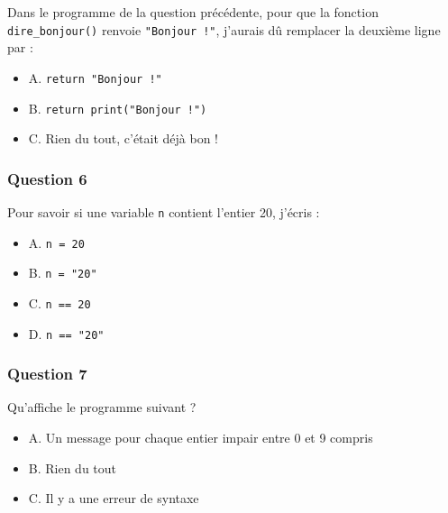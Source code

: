 \documentclass[
]{article}
\newenvironment{Shaded}{}{}
\newcommand{\BuiltInTok}[1]{#1}
\newcommand{\ControlFlowTok}[1]{\textcolor[rgb]{0.00,0.44,0.13}{\textbf{#1}}}
\newcommand{\DecValTok}[1]{\textcolor[rgb]{0.25,0.63,0.44}{#1}}
\newcommand{\KeywordTok}[1]{\textcolor[rgb]{0.00,0.44,0.13}{\textbf{#1}}}
\newcommand{\NormalTok}[1]{#1}
\newcommand{\OperatorTok}[1]{\textcolor[rgb]{0.40,0.40,0.40}{#1}}
\newcommand{\StringTok}[1]{\textcolor[rgb]{0.25,0.44,0.63}{#1}}
\providecommand{\tightlist}{%
  \setlength{\itemsep}{0pt}\setlength{\parskip}{0pt}}
\begin{document}
Dans le programme de la question précédente, pour que la fonction
\texttt{dire\_bonjour()} renvoie \texttt{"Bonjour\ !"}, j'aurais dû
remplacer la deuxième ligne par :

\begin{itemize}
\tightlist
\item
  A. \texttt{return\ "Bonjour\ !"}
\item
  B. \texttt{return\ print("Bonjour\ !")}
\item
  C. Rien du tout, c'était déjà bon !
\end{itemize}

\hypertarget{question-6}{%
\subsubsection{Question 6}\label{question-6}}

Pour savoir si une variable \texttt{n} contient l'entier 20, j'écris :

\begin{itemize}
\tightlist
\item
  A. \texttt{n\ =\ 20}
\item
  B. \texttt{n\ =\ "20"}
\item
  C. \texttt{n\ ==\ 20}
\item
  D. \texttt{n\ ==\ "20"}
\end{itemize}

\hypertarget{question-7}{%
\subsubsection{Question 7}\label{question-7}}

Qu'affiche le programme suivant ?

\begin{Shaded}
\end{Shaded}

\begin{itemize}
\tightlist
\item
  A. Un message pour chaque entier impair entre 0 et 9 compris
\item
  B. Rien du tout
\item
  C. Il y a une erreur de syntaxe
\end{itemize}
\end{document}
